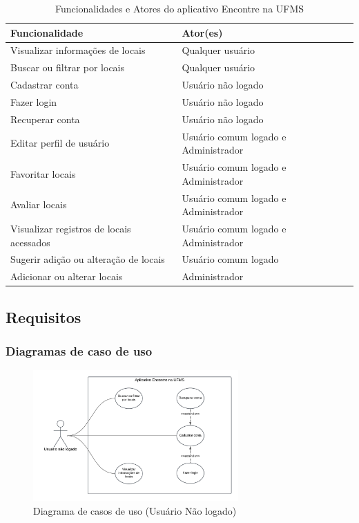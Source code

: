     \begin{table}[h]
        \begin{tabularx}{\textwidth}{|X|X|}
            \hline
            \textbf{Funcionalidade} & \textbf{Ator(es)} \\ \hline
            Visualizar informações de locais & Qualquer usuário \\ \hline
            Buscar ou filtrar por locais & Qualquer usuário \\ \hline
            Cadastrar conta & Usuário não logado \\ \hline
            Fazer login & Usuário não logado \\ \hline
            Recuperar conta & Usuário não logado \\ \hline
            Editar perfil de usuário & Usuário comum logado e Administrador \\ \hline
            Favoritar locais & Usuário comum logado e Administrador \\ \hline
            Avaliar locais & Usuário comum logado e Administrador \\ \hline
            Visualizar registros de locais acessados & Usuário comum logado e Administrador \\ \hline
            Sugerir adição ou alteração de locais & Usuário comum logado \\ \hline
            Adicionar ou alterar locais & Administrador \\ \hline
        \end{tabularx}
        \caption{Funcionalidades e Atores do aplicativo Encontre na UFMS}
        \label{tab:funcionalidades-atores}
    \end{table}
    \FloatBarrier
\subsection{Requisitos}
\subsubsection{Diagramas de caso de uso}

    \begin{figure}[h]
        \centering
        \includegraphics[width=0.7\textwidth]{imagens/usuarioNaoLogado.png}
        \caption{\scriptsize Diagrama de casos de uso (Usuário Não logado)}
        \label{fig:casosDeUsoUsuarioNaoLogado}
    \end{figure}

